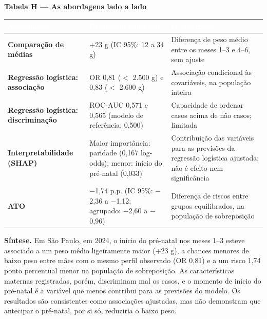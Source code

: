 \documentclass[10pt,a4paper]{article}
\newcommand{\menos}{\ensuremath{-}}
\newcommand{\menor}{\ensuremath{<}}
\begin{document}
\par\vspace{4pt}
{\footnotesize\bfseries\color{iptescuro} Tabela H --- As abordagens lado a lado\par}\vspace{2pt}
{\footnotesize\renewcommand{\arraystretch}{1.2}\setlength{\tabcolsep}{4pt}
\begin{tabular}{>{\raggedright\arraybackslash}p{} >{\raggedright\arraybackslash}p{} >{\raggedright\arraybackslash}p{}}
\rowcolor{iptazul}\textcolor{white}{\bfseries Abordagem} & \textcolor{white}{\bfseries Resultado principal} & \textcolor{white}{\bfseries O que mede} \\ \hline
\textbf{Comparação de médias} & +23 g (IC 95\%: 12 a 34 g) & Diferença de peso médio entre os meses 1--3 e 4--6, sem ajuste \\ \hline
\textbf{Regressão logística: associação} & OR 0,81 (\menor{} 2.500 g) e 0,83 (\menor{} 2.600 g) & Associação condicional às covariáveis, na população inteira \\ \hline
\textbf{Regressão logística: discriminação} & ROC-AUC 0,571 e 0,565 (modelo de referência: 0,500) & Capacidade de ordenar casos acima de não casos; limitada \\ \hline
\textbf{Interpretabilidade (SHAP)} & Maior importância: paridade (0,167 log-odds); menor: início do pré-natal (0,033) & Contribuição das variáveis para as previsões da regressão logística ajustada; não é efeito nem significância \\ \hline
\textbf{ATO} & \menos{}1,74 p.p. (IC 95\%: \menos{}2,36 a \menos{}1,12; agrupado: \menos{}2,60 a \menos{}0,96) & Diferença de riscos entre grupos equilibrados, na população de sobreposição \\ \hline
\end{tabular}\par}\par\vspace{6pt}


\begin{caixa}{\color{iptescuro}\bfseries Síntese.} Em São Paulo, em 2024, o início do pré-natal nos meses 1--3 esteve associado a um peso médio ligeiramente maior (+23 g), a chances menores de baixo peso entre mães com o mesmo perfil observado (OR 0,81) e a um risco 1,74 ponto percentual menor na população de sobreposição. As características maternas registradas, porém, discriminam mal os casos, e o momento de início do pré-natal é a variável que menos contribui para as previsões do modelo. Os resultados são consistentes como associações ajustadas, mas não demonstram que antecipar o pré-natal, por si só, reduziria o baixo peso.\end{caixa}
\end{document}
